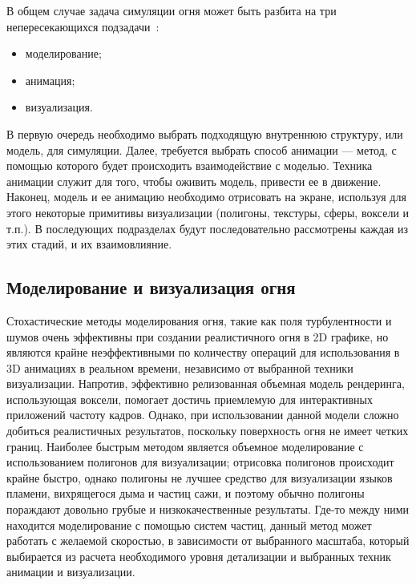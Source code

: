 В общем случае задача симуляции огня может быть разбита на три
непересекающихся подзадачи~\cite{Perry94synthesizingflames}:
\begin{itemize}
	\item моделирование;
	\item анимация;
	\item визуализация.
\end{itemize}

В первую очередь необходимо выбрать подходящую внутреннюю структуру, или модель,
для симуляции. Далее, требуется выбрать способ анимации --- метод, с помощью
которого будет происходить взаимодействие с моделью. Техника анимации служит для
того, чтобы оживить модель, привести ее в движение. Наконец, модель и ее
анимацию необходимо отрисовать на экране, используя для этого некоторые
примитивы визуализации (полигоны, текстуры, сферы, воксели и т.п.). В
последующих подразделах будут последовательно рассмотрены каждая из этих стадий,
и их взаимовлияние.

\subsection{Моделирование и визуализация огня}

Стохастические методы моделирования огня, такие как поля турбулентности и шумов
очень эффективны при создании реалистичного огня в 2D графике, но являются
крайне неэффективными по количеству операций для использования в 3D анимациях в
реальном времени, независимо от выбранной техники визуализации. Напротив,
эффективно релизованная объемная модель рендеринга, использующая воксели,
помогает достичь приемлемую для интерактивных приложений частоту кадров. Однако,
при использовании данной модели сложно добиться реалистичных результатов,
поскольку поверхность огня не имеет четких границ. Наиболее быстрым методом
является объемное моделирование с использованием полигонов для визуализации;
отрисовка полигонов происходит крайне быстро, однако полигоны не лучшее средство
для визуализации языков пламени, вихрящегося дыма и частиц сажи, и поэтому
обычно полигоны пораждают довольно грубые и низкокачественные результаты. Где-то
между ними находится моделирование с помощью систем частиц, данный метод может
работать с желаемой скоростью, в зависимости от выбранного масштаба, который
выбирается из расчета необходимого уровня детализации и выбранных техник
анимации и визуализации.
